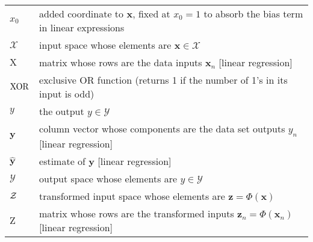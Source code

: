 \documentclass[10pt]{book}
\begin{document}
\begin{longtable}{lp{4.5in}}
${x}_0$ & added coordinate to ${{\mathbf{x}}}$, fixed at ${x}_0=1$ to
absorb the  bias term in linear expressions\\
${\mathcal{X}}$ & input space whose elements are ${{\mathbf{x}}} \in {\mathcal{X}}$\\
${{\mathrm{X}}}$ & matrix whose rows are the data inputs ${{\mathbf{x}}}_n$ [linear regression]\\
$\rm XOR$ & exclusive OR function (returns 1 if the number of 1's in its input is odd)\\
${y}$ & the output ${y}\in{\mathcal{Y}}$ \\
${{\mathbf{y}}}$ & column vector whose components are the data set outputs ${y}_n$ [linear regression]\\
$\hat {{\mathbf{y}}}$ & estimate of ${{\mathbf{y}}}$ [linear regression]\\
${\mathcal{Y}}$ & output space whose elements are ${y} \in {\mathcal{Y}}$\\
$\cal Z$ & transformed input space whose elements are ${{\mathbf{z}}} = \Phi({{\mathbf{x}}})$\\
${{\mathrm{Z}}}$ & matrix whose rows are the transformed inputs ${{\mathbf{z}}}_n
=\Phi({{\mathbf{x}}}_n)$ [linear regression]\\
\end{longtable}
 
\end{document}
